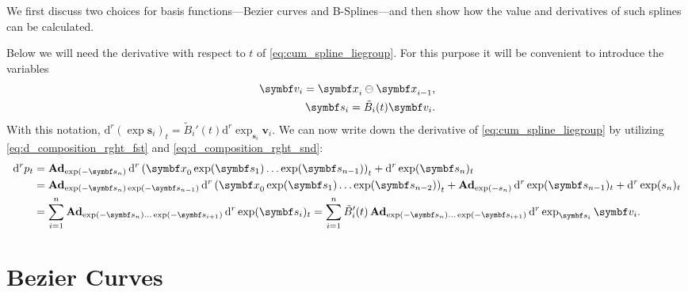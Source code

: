 We first discuss two choices for basis functions---Bezier curves and B-Splines---and then show how the value and derivatives of such splines can be calculated.

Below we will need the derivative with respect to $t$ of \eqref{eq:cum_spline_liegroup}. For this purpose it will be convenient to introduce the variables
\begin{equation}
  \begin{aligned}
    \symbf v_{i} = \x_{i} \ominus \x_{i-1}, \\
    \symbf s_{i} = \tilde B_{i}(t) \symbf v_{i}.
  \end{aligned}
\end{equation}
With this notation, $\mathrm{d}^{r} \left( \exp \symbf s_{i} \right)_{t} = \tilde B_{i}'(t) \mathrm{d}^{r} \exp_{\symbf s_{i}} \symbf v_{i}$. We can now write down the derivative of \eqref{eq:cum_spline_liegroup} by utilizing \eqref{eq:d_composition_rght_fst} and \eqref{eq:d_composition_rght_snd}:
\begin{equation}
  \label{eq:cum_spline_liegroup_deriv}
  \begin{aligned}
    \mathrm{d}^{r} p_{t} & = \bAd_{\exp(-\symbf s_{n})} \mathrm{d}^{r} \left( \x_{0} \exp(\symbf s_{1})  \ldots \exp(\symbf s_{n-1})\right)_{t} + \mathrm{d}^{r} \exp (\symbf s_{n})_{t}                                                                                              \\
                         & = \bAd_{\exp(-\symbf s_{n}) \exp(-\symbf s_{n-1})} \mathrm{d}^{r} \left( \x_{0} \exp(\symbf s_{1})  \ldots \exp(\symbf s_{n-2})\right)_{t} + \bAd_{\exp(-s_{n})} \mathrm{d}^{r} \exp (\symbf s_{n-1})_{t} + \mathrm{d}^{r} \exp(s_{n})_{t}                 \\
                         & = \sum_{i=1}^{n} \bAd_{\exp(-\symbf s_{n}) \ldots \exp(-\symbf s_{i+1})} \mathrm{d}^{r} \exp (\symbf s_{i})_{t} = \sum_{i=1}^{n} \tilde B_{i}'(t) \bAd_{\exp(-\symbf s_{n}) \ldots \exp(-\symbf s_{i+1})} \mathrm{d}^{r} \exp_{\symbf s_{i}} \symbf v_{i}.
  \end{aligned}
\end{equation}

\section{Bezier Curves}

